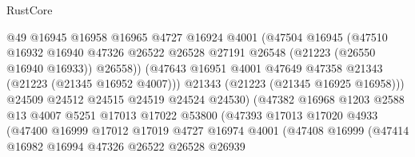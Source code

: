 \begin{lexlean}{RustCore}
\begin{coremodule}
                                @49
                                @16945
                                @16958
                                @16965
                                @4727
                                @16924
                                @4001
                                (@47504
                                  @16945
                                  (@47510
                                    @16932
                                    @16940
                                    @47326
                                    @26522
                                    @26528
                                    @27191
                                    @26548
                                    (@21223 (@26550 @16940 @16933))
                                    @26558))
                                (@47643
                                  @16951
                                  @4001
                                  @47649
                                  @47358
                                  @21343
                                  (@21223 (@21345 @16952 @4007)))
                                @21343
                                (@21223 (@21345 @16925 @16958)))
                              @24509
                              @24512
                              @24515
                              @24519
                              @24524
                              @24530)
                            (@47382
                              @16968
                              @1203
                              @2588
                              @13
                              @4007
                              @5251
                              @17013
                              @17022
                              @53800
                              (@47393
                                @17013
                                @17020
                                @4933
                                (@47400
                                  @16999
                                  @17012
                                  @17019
                                  @4727
                                  @16974
                                  @4001
                                  (@47408
                                    @16999
                                    (@47414
                                      @16982
                                      @16994
                                      @47326
                                      @26522
                                      @26528
                                      @26939

\end{coremodule}
\end{lexlean}
